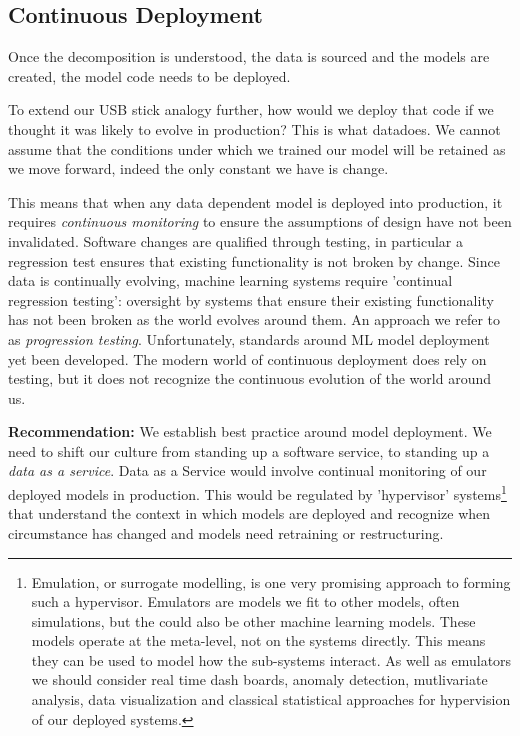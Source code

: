 \documentclass[a4paper]{caesar_book}
\begin{document}
\subsection{Continuous Deployment}

Once the decomposition is understood, the data is sourced and the models are created, the model code needs to be deployed.

To extend our USB stick analogy further, how would we deploy that code if we thought it was likely to evolve in production? This is what datadoes. We cannot assume that the conditions under which we trained our model will be retained as we move forward, indeed the only constant we have is change.

This means that when any data dependent model is deployed into production, it requires \textit{continuous monitoring} to ensure the assumptions of design have not been invalidated. Software changes are qualified through testing, in particular a regression test ensures that existing functionality is not broken by change. Since data is continually evolving, machine learning systems require 'continual regression testing': oversight by systems that ensure their existing functionality has not been broken as the world evolves around them. An approach we refer to as \textit{progression testing}. Unfortunately, standards around ML model deployment yet been developed. The modern world of continuous deployment does rely on testing, but it does not recognize the continuous evolution of the world around us.

\textbf{Recommendation:} We establish best practice around model deployment. We need to shift our culture from standing up a software service, to standing up a \textit{data as a service}. Data as a Service would involve continual monitoring of our deployed models in production. This would be regulated by 'hypervisor' systems\footnote{Emulation, or surrogate modelling, is one very promising approach to forming such a hypervisor. Emulators are models we fit to other models, often simulations, but the could also be other machine learning models. These models operate at the meta-level, not on the systems directly. This means they can be used to model how the sub-systems interact. As well as emulators we should consider real time dash boards, anomaly detection, mutlivariate analysis, data visualization and classical statistical approaches for hypervision of our deployed systems.} that understand the context in which models are deployed and recognize when circumstance has changed and models need retraining or restructuring.
\end{document}
